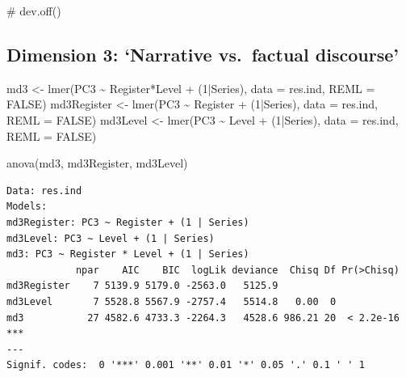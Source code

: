 \documentclass[
  letterpaper,
  DIV=11,
  numbers=noendperiod]{scrreprt}
\newenvironment{Shaded}{\begin{snugshade}}{\end{snugshade}}
\newcommand{\AttributeTok}[1]{\textcolor[rgb]{0.40,0.45,0.13}{#1}}
\newcommand{\CommentTok}[1]{\textcolor[rgb]{0.37,0.37,0.37}{#1}}
\newcommand{\ConstantTok}[1]{\textcolor[rgb]{0.56,0.35,0.01}{#1}}
\newcommand{\DecValTok}[1]{\textcolor[rgb]{0.68,0.00,0.00}{#1}}
\newcommand{\FunctionTok}[1]{\textcolor[rgb]{0.28,0.35,0.67}{#1}}
\newcommand{\NormalTok}[1]{\textcolor[rgb]{0.00,0.23,0.31}{#1}}
\newcommand{\OtherTok}[1]{\textcolor[rgb]{0.00,0.23,0.31}{#1}}
\newcommand{\SpecialCharTok}[1]{\textcolor[rgb]{0.37,0.37,0.37}{#1}}
\begin{document}
\begin{Shaded}
\begin{Highlighting}[]
\CommentTok{\# dev.off()}
\end{Highlighting}
\end{Shaded}

\subsection{Dimension 3: `Narrative vs.~factual
discourse'}\label{dimension-3-narrative-vs.-factual-discourse}

\begin{Shaded}
\begin{Highlighting}[]
\NormalTok{md3 }\OtherTok{\textless{}{-}} \FunctionTok{lmer}\NormalTok{(PC3 }\SpecialCharTok{\textasciitilde{}}\NormalTok{ Register}\SpecialCharTok{*}\NormalTok{Level }\SpecialCharTok{+}\NormalTok{ (}\DecValTok{1}\SpecialCharTok{|}\NormalTok{Series), }\AttributeTok{data =}\NormalTok{ res.ind, }\AttributeTok{REML =} \ConstantTok{FALSE}\NormalTok{)}
\NormalTok{md3Register }\OtherTok{\textless{}{-}} \FunctionTok{lmer}\NormalTok{(PC3 }\SpecialCharTok{\textasciitilde{}}\NormalTok{ Register }\SpecialCharTok{+}\NormalTok{ (}\DecValTok{1}\SpecialCharTok{|}\NormalTok{Series), }\AttributeTok{data =}\NormalTok{ res.ind, }\AttributeTok{REML =} \ConstantTok{FALSE}\NormalTok{)}
\NormalTok{md3Level }\OtherTok{\textless{}{-}} \FunctionTok{lmer}\NormalTok{(PC3 }\SpecialCharTok{\textasciitilde{}}\NormalTok{ Level }\SpecialCharTok{+}\NormalTok{ (}\DecValTok{1}\SpecialCharTok{|}\NormalTok{Series), }\AttributeTok{data =}\NormalTok{ res.ind, }\AttributeTok{REML =} \ConstantTok{FALSE}\NormalTok{)}

\FunctionTok{anova}\NormalTok{(md3, md3Register, md3Level)}
\end{Highlighting}
\end{Shaded}

\begin{verbatim}
Data: res.ind
Models:
md3Register: PC3 ~ Register + (1 | Series)
md3Level: PC3 ~ Level + (1 | Series)
md3: PC3 ~ Register * Level + (1 | Series)
            npar    AIC    BIC  logLik deviance  Chisq Df Pr(>Chisq)    
md3Register    7 5139.9 5179.0 -2563.0   5125.9                         
md3Level       7 5528.8 5567.9 -2757.4   5514.8   0.00  0               
md3           27 4582.6 4733.3 -2264.3   4528.6 986.21 20  < 2.2e-16 ***
---
Signif. codes:  0 '***' 0.001 '**' 0.01 '*' 0.05 '.' 0.1 ' ' 1
\end{verbatim}
\end{document}
